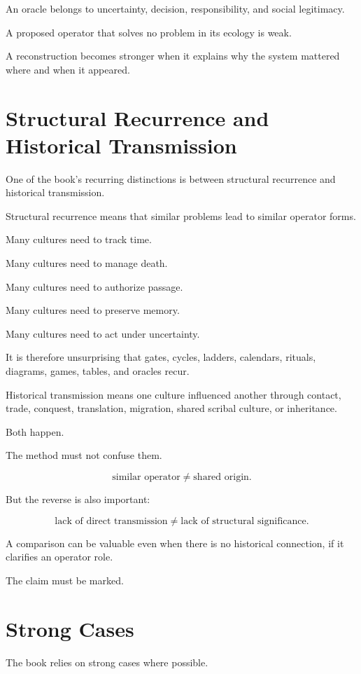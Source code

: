 \documentclass[11pt]{book}
\begin{document}
An oracle belongs to uncertainty, decision, responsibility, and social legitimacy.

A proposed operator that solves no problem in its ecology is weak.

A reconstruction becomes stronger when it explains why the system mattered where and when it appeared.

\section{Structural Recurrence and Historical Transmission}

One of the book's recurring distinctions is between structural recurrence and historical transmission.

Structural recurrence means that similar problems lead to similar operator forms.

Many cultures need to track time.

Many cultures need to manage death.

Many cultures need to authorize passage.

Many cultures need to preserve memory.

Many cultures need to act under uncertainty.

It is therefore unsurprising that gates, cycles, ladders, calendars, rituals, diagrams, games, tables, and oracles recur.

Historical transmission means one culture influenced another through contact, trade, conquest, translation, migration, shared scribal culture, or inheritance.

Both happen.

The method must not confuse them.

\[
\text{similar operator} \neq \text{shared origin}.
\]

But the reverse is also important:

\[
\text{lack of direct transmission} \neq \text{lack of structural significance}.
\]

A comparison can be valuable even when there is no historical connection, if it clarifies an operator role.

The claim must be marked.

\section{Strong Cases}

The book relies on strong cases where possible.
\end{document}
